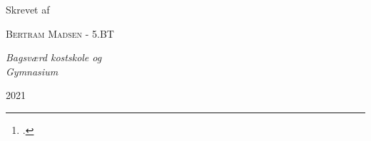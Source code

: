 \documentclass[a4paper, 8pt, oneside]{article} %
\newcommand{\plogo}{\fbox{$\mathcal{BM}$}}
\begin{document}
\begin{titlepage}
	Skrevet af
	
	\vspace{0.5\baselineskip} %
	
	{\scshape\Large Bertram Madsen - 5.BT} %
	
	\vspace{0.5\baselineskip} %
	
	\textit{Bagsværd kostskole og\\ Gymnasium} %
	
	\vfill %
	
	
	\plogo %
	
	\vspace{0.3\baselineskip} %
	
	2021 %
	
\end{titlepage}

\newpage
\tableofcontents
\newpage

\newpage
\begin{abstract}
	En demokratisk samfundstruktur er noget vi ser spille absolut central rolle i langt de fleste vestlige samfund, og noget som - til en vis grad - lægger til grund for næsten alle beslutninger og ændringer der idag bliver fortaget på landsplan i langt de fleste lande i hele verden.\footcite{desilver_despite_nodate}. På trods af dette er demokratiske proccessor - som bl.a. eksemplificeret ved det danske folktingsvalg - ikke nogle processor som får særligt meget opmærksomhed, og har derfor i stor grad ikke fulgt med den teknologiske udvikling som ellers har præget resten af de vestlige samfund.\\
    
	Dette projekt arbejder med at forsøge at belyse udfordringerne ved traditionelle valg, både i form af dem vi ser udelukkende ved brug af klassiske metoder som i Danmark, samt delvist digitaliserede valg som vi ser dem f.eks. i USA. I forbindelse med dette opstilles der et potentielt løsningsforslag ved brug af moderne blockchain teknologier, der redegøres for matematiken bag som gør det muligt og der diskuteres potentielle udfordringer ved denne type løsning og hvordan disse muligvis kan imødekommes.
\end{abstract}
\end{document}
